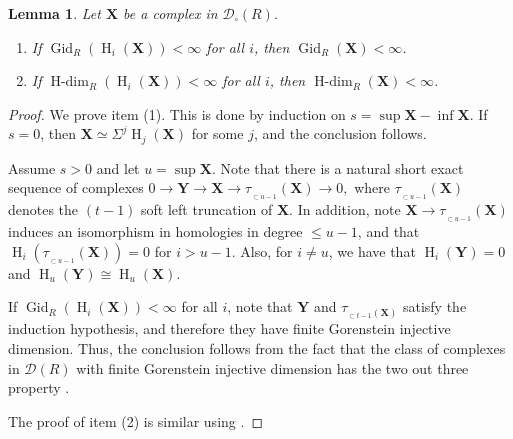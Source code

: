 \documentclass[11pt, a4paper,pagebackref]{amsart}
\numberwithin{equation}{section}
\newtheorem{lemma}[theorem]{Lemma}
\theoremstyle{definition}
\newtheorem{remark and definition}[theorem]{Remark and Definition}
\newtheorem{remark and notation}[theorem]{Remark and Notation}
\DeclareMathOperator{\gid}{Gid}
\begin{document}
\begin{lemma} \label{lemGid} \label{lemHdim}
    Let $ \boldsymbol{X}$
    be a complex in $\mathcal{D}_{\square}(R).$
    \begin{enumerate}[\rm(1)]
        \item If $\gid_R(\operatorname{H}_i(\boldsymbol{X}))<\infty$ for all $i$, then $\gid_R(\boldsymbol{X})<\infty$.
        \item If $\operatorname{H-dim}_R(\operatorname{H}_i(\boldsymbol{X}))<\infty$ for all $i$, then $\operatorname{H-dim}_R(\boldsymbol{X})<\infty$. 
    \end{enumerate}
\end{lemma}
\begin{proof} We prove item (1). This is done by induction on $s=\sup \boldsymbol{X}-\inf \boldsymbol{X}$. If $s=0$, then $\boldsymbol{X}\simeq \Sigma^j \operatorname{H}_j(\boldsymbol{X})$ for some $j$, and the conclusion follows. 

Assume $s>0$ and let $u=\sup \boldsymbol{X}$. Note that there is a natural short exact sequence of complexes $0\to \boldsymbol{Y} \to \boldsymbol{X} \to \tau_{_{\subset u-1}}(\boldsymbol{X})\to 0, $ where $\tau_{_{\subset u-1}}(\boldsymbol{X})$ denotes the $(t-1)$ soft left truncation of $\boldsymbol{X}$. In addition, note 
    $\boldsymbol{X} \to \tau_{_{\subset u-1}}(\boldsymbol{X})$ induces an isomorphism in homologies in degree $\leq u-1$, and that $\operatorname{H}_i(\tau_{_{\subset u-1}}(\boldsymbol{X}))=0$ for $i>u-1$. Also, for $i \not=u$, we have that $\operatorname{H}_i(\boldsymbol{Y})=0$ and $\operatorname{H}_u(\boldsymbol{Y})\cong \operatorname{H}_u(\boldsymbol{X})$. 

     If $\gid_R(\operatorname{H}_i(\boldsymbol{X}))<\infty$ for all $i$, note that $\boldsymbol{Y}$ and $\tau_{_{\subset t-1}(\boldsymbol{X})}$ satisfy the induction hypothesis, and therefore they have finite Gorenstein injective dimension. Thus, the conclusion follows from the fact that the class of complexes in $\mathcal{D}(R)$ with finite Gorenstein injective dimension has the two out three property \cite[Proposition 9.2.15]{DerivedCategoryMethodsInCommutativeAlgebra}.

 The proof of item (2) is similar using  \cite[Corollary 8.1.9 and Proposition 9.1.16]{DerivedCategoryMethodsInCommutativeAlgebra}.
\end{proof}
 
\end{document}
